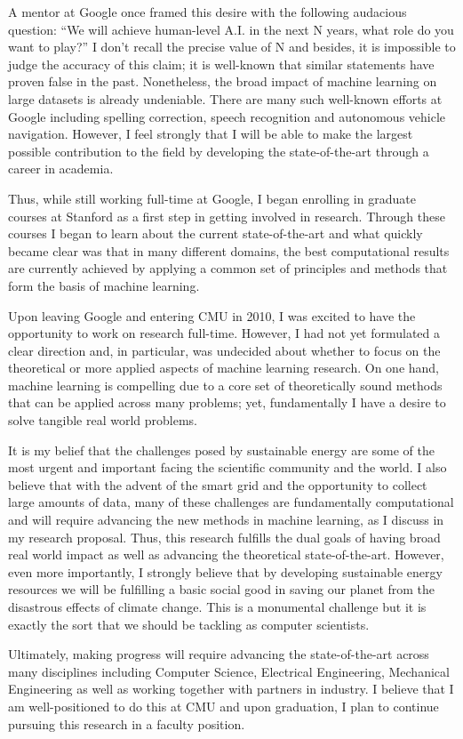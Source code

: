\documentclass[12pt]{article}
\begin{document}
A mentor at Google once framed this desire with the following audacious question: ``We will achieve human-level A.I. in the next N years, what role do you want to play?'' I don't recall the precise value of N  and besides, it is impossible to judge the accuracy of this claim; it is well-known that similar statements have proven false in the past. Nonetheless, the broad impact of machine learning on large datasets is already undeniable. There are many such well-known efforts at Google including spelling correction, speech recognition and autonomous vehicle navigation. However, I feel strongly that I will be able to make the largest possible contribution to the field by developing the state-of-the-art through a career in academia.

Thus, while still working full-time at Google, I began enrolling in graduate courses at Stanford as a first step in getting involved in research. Through these courses I began to learn about the current state-of-the-art and what quickly became clear was that in many different domains, the best computational results are currently achieved by applying a common set of principles and methods that form the basis of machine learning.

Upon leaving Google and entering CMU in 2010, I was excited to have the opportunity to work on research full-time. However, I had not yet formulated a clear direction and, in particular, was undecided about whether to focus on the theoretical or more applied aspects of machine learning research. On one hand, machine learning is compelling due to a core set of theoretically sound methods that can be applied across many problems; yet, fundamentally I have a desire to solve tangible real world problems. 

It is my belief that the challenges posed by sustainable energy are some of the most urgent and important facing the scientific community and the world. I also believe that with the advent of the smart grid and the opportunity to collect large amounts of data, many of these challenges are fundamentally computational and will require advancing the new methods in machine learning, as I discuss in my research proposal. Thus, this research fulfills the dual goals of having broad real world impact as well as advancing the theoretical state-of-the-art. However, even more importantly, I strongly believe that by developing sustainable energy resources we will be fulfilling a basic social good in saving our planet from the disastrous effects of climate change. This is a monumental challenge but it is exactly the sort that we should be tackling as computer scientists.

Ultimately, making progress will require advancing the state-of-the-art across many disciplines including Computer Science, Electrical Engineering, Mechanical Engineering as well as working together with partners in industry. I believe that I am well-positioned to do this at CMU and upon graduation, I plan to continue pursuing this research in a faculty position.

\renewcommand{\refname}{\vskip -1.5cm}
\footnotesize


\end{document}
